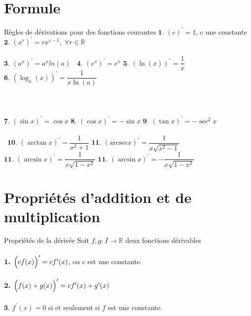 \documentclass[2pt]{report}
\begin{document}
\begin{multicols*}{3}
\section{Formule}
\begin{Concept}{Règles de dérivations pour des fonctions courantes}{}
  $ \textbf{1. }   (c)^{\prime} = 1$, c une constante \;\;
  $ \textbf{2. }   (x^r)^{\prime} = rx^{r -1}, \; \forall r \in \mathbb{R}$ \\\\
  $ \textbf{3. }   (a^x)^{\prime} = a^xln(a)\;\;$ 
  $ \textbf{4. }   (e^x)^{\prime} = e^x$ \;\; 
  $ \textbf{5. }   (\ln(x))^{\prime} = \dfrac{1}{x} $ \;\; 
  $ \textbf{6. }   (\log_a(x))^{\prime} = \dfrac{1}{x\ln(a)}$ \\\\\\\\
  $ \textbf{7. }   (\sin x)^{\prime} = \cos x$ \;\; 
  $ \textbf{8. }   (\cos x)^{\prime} = - \sin x$ \;\;
  $ \textbf{9. }   (\tan x)^{\prime} = -\sec^2 x$ \\\\\
  $ \textbf{10. }   (\arctan x)^{\prime} = \dfrac{1}{x^2 +1}$ \;\;
  $ \textbf{11. }   (\text{arcsec}x)^{\prime} = \dfrac{1}{x\sqrt{x^2 -1}}$ \;\;
  $ \textbf{11. }   (\arcsin x)^{\prime} = \dfrac{1}{x\sqrt{1 - x^2}}$ \;\;
  $ \textbf{11. }   (\arcsin x)^{\prime} = -\dfrac{1}{x\sqrt{1 - x^2}}$ \;\;

\end{Concept}

\section{Propriétés d'addition et de multiplication}
\begin{Concept}{Propriétés de la dérivée}{}
  Soit $f, g \text{:} \; I \rightarrow \mathbb{R}$ deux fonctions dérivables \\\\
  $\textbf{1. } \Bigl(cf(x)\Bigr)^{\prime} = cf^{\prime}(x)$, ou c est une constante. \\\\
  $\textbf{2. } \Bigl(f(x) + g(x)\Bigr)^{\prime} = cf^{\prime}(x) +  g^{\prime}(x)$ \\\\
  $\textbf{3. } f^{\prime}(x) = 0$ si et seulement si $f$ est une constante. 
\end{Concept}




\end{multicols*}
\end{document}
